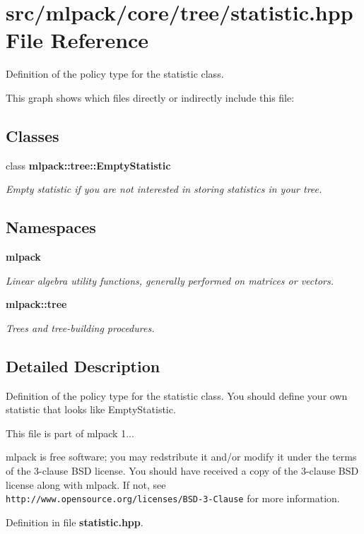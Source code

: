 \section{src/mlpack/core/tree/statistic.hpp File Reference}
\label{statistic_8hpp}


Definition of the policy type for the statistic class.  


This graph shows which files directly or indirectly include this file\-:
\subsection*{Classes}
\begin{DoxyCompactItemize}
\item 
class {\bf mlpack\-::tree\-::\-Empty\-Statistic}
\begin{DoxyCompactList}\small\item\em Empty statistic if you are not interested in storing statistics in your tree. \end{DoxyCompactList}\end{DoxyCompactItemize}
\subsection*{Namespaces}
\begin{DoxyCompactItemize}
\item 
{\bf mlpack}
\begin{DoxyCompactList}\small\item\em Linear algebra utility functions, generally performed on matrices or vectors. \end{DoxyCompactList}\item 
{\bf mlpack\-::tree}
\begin{DoxyCompactList}\small\item\em Trees and tree-\/building procedures. \end{DoxyCompactList}\end{DoxyCompactItemize}


\subsection{Detailed Description}
Definition of the policy type for the statistic class. You should define your own statistic that looks like Empty\-Statistic.

This file is part of mlpack 1...

mlpack is free software; you may redstribute it and/or modify it under the terms of the 3-\/clause B\-S\-D license. You should have received a copy of the 3-\/clause B\-S\-D license along with mlpack. If not, see {\tt http\-://www.\-opensource.\-org/licenses/\-B\-S\-D-\/3-\/\-Clause} for more information. 

Definition in file {\bf statistic.\-hpp}.

